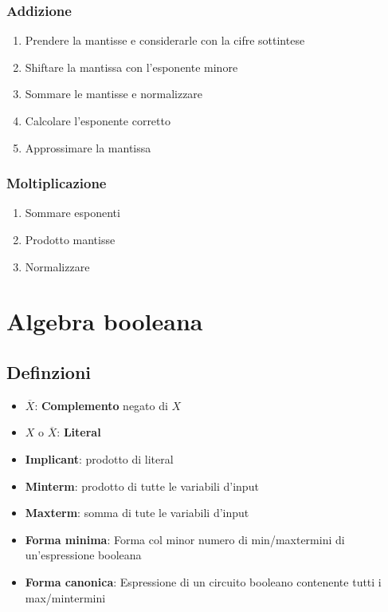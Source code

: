 \documentclass{report}
\newcommand{\n}[1]{\overline{#1}}
\begin{document}
        \subsubsection{Addizione}
        \begin{enumerate}
            \item Prendere la mantisse e considerarle con la cifre sottintese
            \item Shiftare la mantissa con l'esponente minore
            \item Sommare le mantisse e normalizzare
            \item Calcolare l'esponente corretto
            \item Approssimare la mantissa
        \end{enumerate}
        \subsubsection{Moltiplicazione}
        \begin{enumerate}
            \item Sommare esponenti
            \item Prodotto mantisse
            \item Normalizzare 
        \end{enumerate}
\newpage
\section{Algebra booleana}
    \subsection{Definzioni}
        \begin{itemize}
            \item $\n{X}$: \textbf{Complemento} negato di $X$
            \item $X$ o $\n{X}$: \textbf{Literal}
            \item \textbf{Implicant}: prodotto di literal
            \item \textbf{Minterm}: prodotto di tutte le variabili d'input
            \item \textbf{Maxterm}: somma di tute le variabili d'input
            \item \textbf{Forma minima}: Forma col minor numero di min/maxtermini di un'espressione booleana
            \item \textbf{Forma canonica}: Espressione  di un circuito booleano contenente
                tutti i max/mintermini
        \end{itemize}
\end{document}
